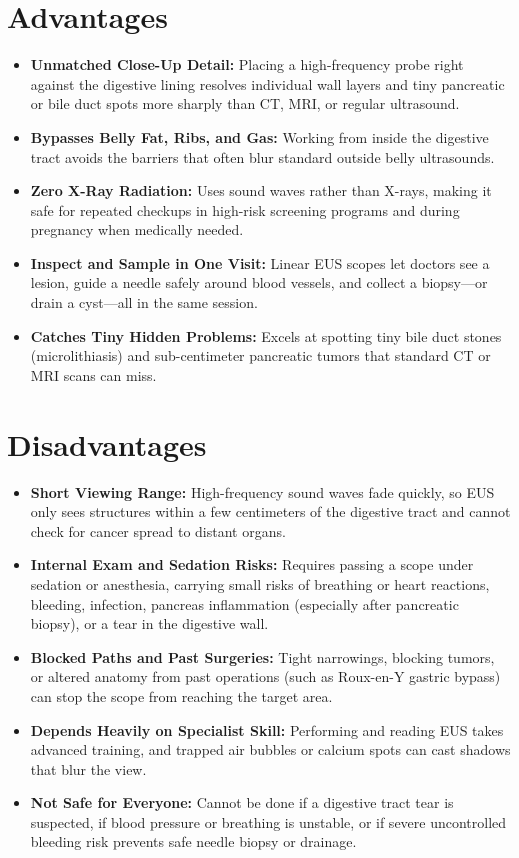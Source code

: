 \section{Advantages}

\begin{itemize}
    \item \textbf{Unmatched Close-Up Detail:} Placing a high-frequency probe right against the digestive lining resolves individual wall layers and tiny pancreatic or bile duct spots more sharply than CT, MRI, or regular ultrasound.
    \item \textbf{Bypasses Belly Fat, Ribs, and Gas:} Working from inside the digestive tract avoids the barriers that often blur standard outside belly ultrasounds.
    \item \textbf{Zero X-Ray Radiation:} Uses sound waves rather than X-rays, making it safe for repeated checkups in high-risk screening programs and during pregnancy when medically needed.
    \item \textbf{Inspect and Sample in One Visit:} Linear EUS scopes let doctors see a lesion, guide a needle safely around blood vessels, and collect a biopsy---or drain a cyst---all in the same session.
    \item \textbf{Catches Tiny Hidden Problems:} Excels at spotting tiny bile duct stones (microlithiasis) and sub-centimeter pancreatic tumors that standard CT or MRI scans can miss.
\end{itemize}

\section{Disadvantages}

\begin{itemize}
    \item \textbf{Short Viewing Range:} High-frequency sound waves fade quickly, so EUS only sees structures within a few centimeters of the digestive tract and cannot check for cancer spread to distant organs.
    \item \textbf{Internal Exam and Sedation Risks:} Requires passing a scope under sedation or anesthesia, carrying small risks of breathing or heart reactions, bleeding, infection, pancreas inflammation (especially after pancreatic biopsy), or a tear in the digestive wall.
    \item \textbf{Blocked Paths and Past Surgeries:} Tight narrowings, blocking tumors, or altered anatomy from past operations (such as Roux-en-Y gastric bypass) can stop the scope from reaching the target area.
    \item \textbf{Depends Heavily on Specialist Skill:} Performing and reading EUS takes advanced training, and trapped air bubbles or calcium spots can cast shadows that blur the view.
    \item \textbf{Not Safe for Everyone:} Cannot be done if a digestive tract tear is suspected, if blood pressure or breathing is unstable, or if severe uncontrolled bleeding risk prevents safe needle biopsy or drainage.
\end{itemize}

